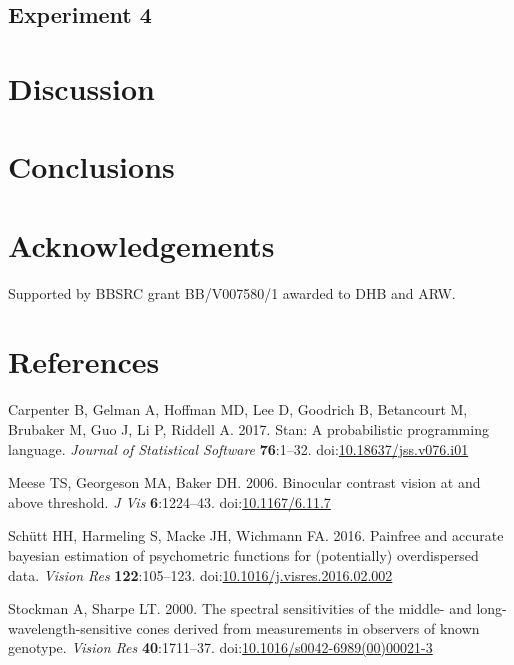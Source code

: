 \documentclass[
]{article}
\newlength{\cslhangindent}
\newlength{\cslentryspacingunit} %
\newenvironment{CSLReferences}[2] %
 {%
  \setlength{\parindent}{0pt}
  \ifodd #1
  \let\oldpar\par
  \def\par{\hangindent=\cslhangindent\oldpar}
  \fi
  \setlength{\parskip}{#2\cslentryspacingunit}
 }%
 {}
\begin{document}
\hypertarget{experiment-4}{%
\subsection{Experiment 4}\label{experiment-4}}

\hypertarget{discussion}{%
\section{Discussion}\label{discussion}}

\hypertarget{conclusions}{%
\section{Conclusions}\label{conclusions}}

\hypertarget{acknowledgements}{%
\section{Acknowledgements}\label{acknowledgements}}

Supported by BBSRC grant BB/V007580/1 awarded to DHB and ARW.

\hypertarget{references}{%
\section*{References}\label{references}}

\hypertarget{refs}{}
\begin{CSLReferences}{1}{0}
\leavevmode{}%
Carpenter B, Gelman A, Hoffman MD, Lee D, Goodrich B, Betancourt M, Brubaker M, Guo J, Li P, Riddell A. 2017. Stan: A probabilistic programming language. \emph{Journal of Statistical Software} \textbf{76}:1--32. doi:\href{https://doi.org/10.18637/jss.v076.i01}{10.18637/jss.v076.i01}

\leavevmode{}%
Meese TS, Georgeson MA, Baker DH. 2006. Binocular contrast vision at and above threshold. \emph{J Vis} \textbf{6}:1224--43. doi:\href{https://doi.org/10.1167/6.11.7}{10.1167/6.11.7}

\leavevmode{}%
Schütt HH, Harmeling S, Macke JH, Wichmann FA. 2016. Painfree and accurate bayesian estimation of psychometric functions for (potentially) overdispersed data. \emph{Vision Res} \textbf{122}:105--123. doi:\href{https://doi.org/10.1016/j.visres.2016.02.002}{10.1016/j.visres.2016.02.002}

\leavevmode{}%
Stockman A, Sharpe LT. 2000. The spectral sensitivities of the middle- and long-wavelength-sensitive cones derived from measurements in observers of known genotype. \emph{Vision Res} \textbf{40}:1711--37. doi:\href{https://doi.org/10.1016/s0042-6989(00)00021-3}{10.1016/s0042-6989(00)00021-3}

\end{CSLReferences}
\end{document}
